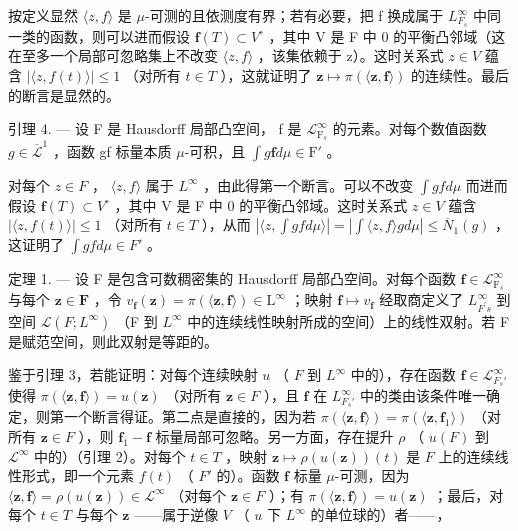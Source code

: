 按定义显然 \(\langle z,f\rangle\) 是 \(\mu\)-可测的且依测度有界；若有必要，把 f 换成属于 \(L_{F_{s}}^{\infty}\) 中同一类的函数，则可以进而假设 \(\mathbf{f}(T)\subset V^{\circ}\) ，其中 V 是 F 中 0 的平衡凸邻域（这在至多一个局部可忽略集上不改变 \(\langle z,f\rangle\) ，该集依赖于 z）。这时关系式 \(z\in V\) 蕴含 \(|\langle z,f(t)\rangle|\leqslant1\) （对所有 \(t\in T\) ），这就证明了 \(\mathbf{z}\mapsto\pi(\langle\mathbf{z},\mathbf{f}\rangle)\) 的连续性。最后的断言是显然的。

引理 4. --- 设 F 是 Hausdorff 局部凸空间， f 是 \(\mathcal{L}_{\mathrm{F}_s}^\infty\) 的元素。对每个数值函数 \(g \in \overline{\mathcal{L}}^1\) ，函数 gf 标量本质 \(\mu\)-可积，且 \(\int g\mathbf{f} d\mu \in \mathrm{F}'\) 。

对每个 \(z \in F\) ， \(\langle z, f \rangle\) 属于 \(L^{\infty}\) ，由此得第一个断言。可以不改变 \(\int g f d\mu\) 而进而假设 \(\mathbf{f}(T) \subset V^{\circ}\) ，其中 V 是 F 中 0 的平衡凸邻域。这时关系式 \(z \in V\) 蕴含 \(|\langle z, f(t) \rangle| \leqslant 1\) （对所有 \(t \in T\) ），从而 \(|\langle z, \int g f d\mu \rangle| = |\int \langle z, f \rangle g d\mu| \leqslant \overline{N}_{1}(g)\) ，这证明了 \(\int g f d\mu \in F'\) 。

定理 1. --- 设 F 是包含可数稠密集的 Hausdorff 局部凸空间。对每个函数 \(\mathbf{f} \in \mathcal{L}_{\mathrm{F}_s}^\infty\) 与每个 \(\mathbf{z} \in \mathbf{F}\) ，令 \(v_{\mathbf{f}}(\mathbf{z}) = \pi (\langle \mathbf{z}, \mathbf{f} \rangle) \in \mathrm{L}^{\infty}\) ；映射 \(\mathbf{f} \mapsto v_{\mathbf{f}}\) 经取商定义了 \(L_{F^{\prime}s}^{\infty}\) 到空间 \(\mathcal{L}(F;L^{\infty})\) （F 到 \(L^{\infty}\) 中的连续线性映射所成的空间）上的线性双射。若 F 是赋范空间，则此双射是等距的。

鉴于引理 3，若能证明：对每个连续映射 \(u\) （ \(F\) 到 \(L^{\infty}\) 中的），存在函数 \(\mathbf{f} \in \mathcal{L}_{F_s'}^{\infty}\) 使得 \(\pi(\langle \mathbf{z}, \mathbf{f} \rangle) = u(\mathbf{z})\) （对所有 \(\mathbf{z} \in F\) ），且 \(\mathbf{f}\) 在 \(L_{F_s'}^{\infty}\) 中的类由该条件唯一确定，则第一个断言得证。第二点是直接的，因为若 \(\pi(\langle \mathbf{z}, \mathbf{f} \rangle) = \pi(\langle \mathbf{z}, \mathbf{f}_1 \rangle)\) （对所有 \(\mathbf{z} \in F\) ），则 \(\mathbf{f}_1 - \mathbf{f}\) 标量局部可忽略。另一方面，存在提升 \(\rho\) （ \(u(F)\) 到 \(\mathcal{L}^{\infty}\) 中的）（引理 2）。对每个 \(t \in T\) ，映射 \(\mathbf{z} \mapsto \rho(u(\mathbf{z}))(t)\) 是 \(F\) 上的连续线性形式，即一个元素 \(f(t)\) （ \(F'\) 的）。函数 \(\mathbf{f}\) 标量 \(\mu\)-可测，因为 \(\langle \mathbf{z}, \mathbf{f} \rangle = \rho(u(\mathbf{z})) \in \mathcal{L}^{\infty}\) （对每个 \(\mathbf{z} \in F\) ）；有 \(\pi(\langle \mathbf{z}, \mathbf{f} \rangle) = u(\mathbf{z})\) ；最后，对每个 \(t \in T\) 与每个 \(\mathbf{z}\) ——属于逆像 \(V\) （ \(u\) 下 \(L^{\infty}\) 的单位球的）者——，

